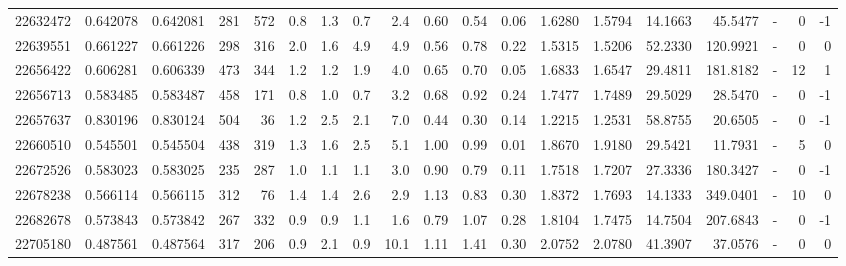 \begin{tabular}{rrrrrrrrrrrrrrrrlrr}
  22632472 & 0.642078 &   0.642081 &  281 &  572 &      0.8 &      1.3 &     0.7 &      2.4 &       0.60 &        0.54 &        0.06 &  1.6280 &  1.5794 &   14.1663 &   45.5477 &             - &        0 &         -1 \\
  22639551 & 0.661227 &   0.661226 &  298 &  316 &      2.0 &      1.6 &     4.9 &      4.9 &       0.56 &        0.78 &        0.22 &  1.5315 &  1.5206 &   52.2330 &  120.9921 &             - &        0 &          0 \\
  22656422 & 0.606281 &   0.606339 &  473 &  344 &      1.2 &      1.2 &     1.9 &      4.0 &       0.65 &        0.70 &        0.05 &  1.6833 &  1.6547 &   29.4811 &  181.8182 &             - &       12 &          1 \\
  22656713 & 0.583485 &   0.583487 &  458 &  171 &      0.8 &      1.0 &     0.7 &      3.2 &       0.68 &        0.92 &        0.24 &  1.7477 &  1.7489 &   29.5029 &   28.5470 &             - &        0 &         -1 \\
  22657637 & 0.830196 &   0.830124 &  504 &   36 &      1.2 &      2.5 &     2.1 &      7.0 &       0.44 &        0.30 &        0.14 &  1.2215 &  1.2531 &   58.8755 &   20.6505 &             - &        0 &         -1 \\
  22660510 & 0.545501 &   0.545504 &  438 &  319 &      1.3 &      1.6 &     2.5 &      5.1 &       1.00 &        0.99 &        0.01 &  1.8670 &  1.9180 &   29.5421 &   11.7931 &             - &        5 &          0 \\
  22672526 & 0.583023 &   0.583025 &  235 &  287 &      1.0 &      1.1 &     1.1 &      3.0 &       0.90 &        0.79 &        0.11 &  1.7518 &  1.7207 &   27.3336 &  180.3427 &             - &        0 &         -1 \\
  22678238 & 0.566114 &   0.566115 &  312 &   76 &      1.4 &      1.4 &     2.6 &      2.9 &       1.13 &        0.83 &        0.30 &  1.8372 &  1.7693 &   14.1333 &  349.0401 &             - &       10 &          0 \\
  22682678 & 0.573843 &   0.573842 &  267 &  332 &      0.9 &      0.9 &     1.1 &      1.6 &       0.79 &        1.07 &        0.28 &  1.8104 &  1.7475 &   14.7504 &  207.6843 &             - &        0 &         -1 \\
  22705180 & 0.487561 &   0.487564 &  317 &  206 &      0.9 &      2.1 &     0.9 &     10.1 &       1.11 &        1.41 &        0.30 &  2.0752 &  2.0780 &   41.3907 &   37.0576 &             - &        0 &          0 \\

\end{tabular}
